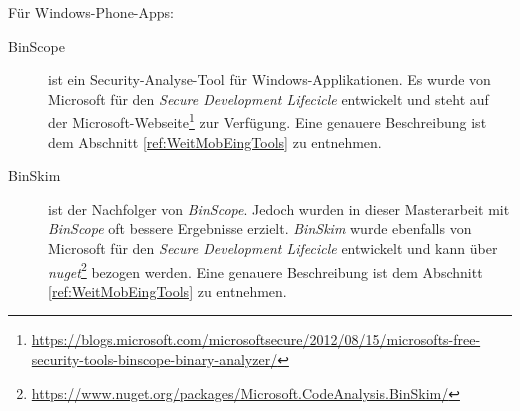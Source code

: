 $ $\\
Für Windows-Phone-Apps:
\begin{description}
	\item[BinScope ] ist ein Security-Analyse-Tool für Windows-Applikationen. Es wurde von Microsoft für den \textit{Secure Development Lifecicle} entwickelt und steht auf der Microsoft-Webseite\footnote{\url{https://blogs.microsoft.com/microsoftsecure/2012/08/15/microsofts-free-security-tools-binscope-binary-analyzer/}} zur Verfügung. Eine genauere Beschreibung ist dem Abschnitt \ref{ref:WeitMobEingTools} zu entnehmen.
	
	\item[BinSkim ] ist der Nachfolger von \textit{BinScope}. Jedoch wurden in dieser Masterarbeit mit \textit{BinScope} oft bessere Ergebnisse erzielt. \textit{BinSkim} wurde ebenfalls von Microsoft für den \textit{Secure Development Lifecicle} entwickelt und kann über \textit{nuget}\footnote{\url{https://www.nuget.org/packages/Microsoft.CodeAnalysis.BinSkim/}} bezogen werden. Eine genauere Beschreibung ist dem Abschnitt \ref{ref:WeitMobEingTools} zu entnehmen.
\end{description}
